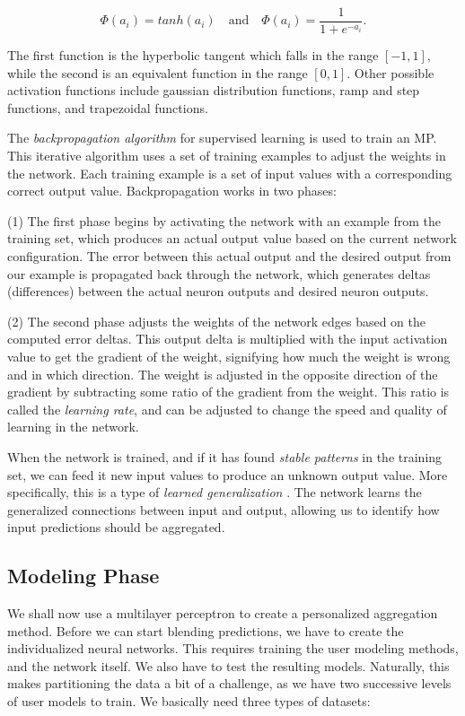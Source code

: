 \begin{equation*}
  \Phi(a_i) = tanh(a_i) \quad \text{and} \quad \Phi(a_i) = \frac{1}{1 + e^{-a_i}}.
\end{equation*}

The first function is the hyperbolic tangent which falls in the range $[-1,1]$,
while the second is an equivalent function in the range $[0,1]$.
Other possible activation functions include
gaussian distribution functions, ramp and step functions, and trapezoidal
functions.

The \emph{backpropagation algorithm} for supervised learning \cite[p578]{Russell1995}
is used to train an MP.
This iterative algorithm uses a set of training examples to adjust the weights in 
the network. Each training example is a set of input values with a corresponding correct output value.
Backpropagation works in two phases:

(1) The first phase begins by activating the network with an example from the training set,
which produces an actual output value based on the current network configuration.
The error between this actual output and the desired output from our example
is propagated back through the network, which generates deltas (differences)
between the actual neuron outputs and desired neuron outputs.

(2) The second phase adjusts the weights of the network edges based on the computed error deltas.
This output delta is multiplied with the input activation value to get the gradient of the weight,
signifying how much the weight is wrong and in which direction.
The weight is adjusted in the opposite direction of the gradient by subtracting some ratio
of the gradient from the weight. 
This ratio is called the \emph{learning rate},
and can be adjusted to change the speed and quality of learning in the network.

When the network is trained, and if it has found \emph{stable patterns} in the training set,
we can feed it new input values to produce an unknown output value.
More specifically, this is a type of \emph{learned generalization} \cite[p177]{Floreano2008}.
The network learns the generalized connections between input and output,
allowing us to identify how input predictions should be aggregated.


\subsection{Modeling Phase}

We shall now use a multilayer perceptron to create a personalized aggregation method.
Before we can start blending predictions, we have to create the individualized neural networks.
This requires training the user modeling methods, and the network itself.
We also have to test the resulting models.
Naturally, this makes partitioning the data a bit of a challenge, as we have two successive levels of user models to train.
We basically need three types of datasets: 

